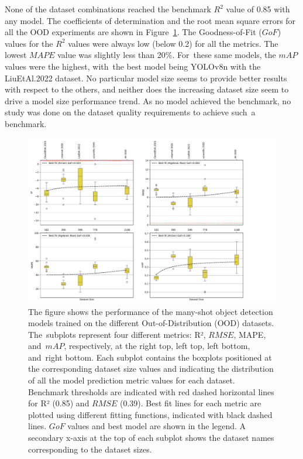 \documentclass[12pt,a4paper,oneside]{report}
\begin{document}
None of the dataset combinations reached the benchmark $R^2$ value of 0.85 with any model.
The coefficients of determination and the root mean square errors 
for all the OOD experiments are shown in Figure~\ref{fig:metrics_OOD_datasets}.
The Goodness-of-Fit ($GoF$) values for the $R^2$ values were always low (below 0.2) for all the metrics.
The lowest $MAPE$ value was slightly less than 20\%. For~these same models, the $mAP$ values
were the highest, with~the best model being YOLOv8n with the LiuEtAl.2022 dataset.
No particular model size seems to provide better results with respect to the others, and
neither does the increasing dataset size seem to drive a model size performance trend.
As no model achieved the benchmark, no study was done on the dataset quality requirements
to achieve such~a benchmark.
\vspace{-4pt}
\begin{figure}[H]
\includegraphics[width=\textwidth]{Plots/metrics_OOD_datasets.pdf}
\caption{The figure shows the performance of the many-shot object detection models 
trained on 
the different Out-of-Distribution (OOD) datasets. The~subplots represent four different metrics: 
R², $RMSE$, MAPE, and~$mAP$, respectively, at the right top, left top, left bottom, and~right bottom.
Each subplot contains the boxplots
positioned at the corresponding dataset size values and indicating the distribution of
all the model prediction metric values for each dataset.
Benchmark thresholds are indicated with red 
dashed horizontal lines for R² (0.85) and $RMSE$ (0.39). Best fit lines for each metric are 
plotted using different fitting functions, 
indicated with black dashed lines. $GoF$ values and best model are shown in the
legend.
A secondary x-axis at the top of each subplot 
shows the dataset names corresponding to the dataset sizes.}
\label{fig:metrics_OOD_datasets}
\end{figure}
\end{document}
